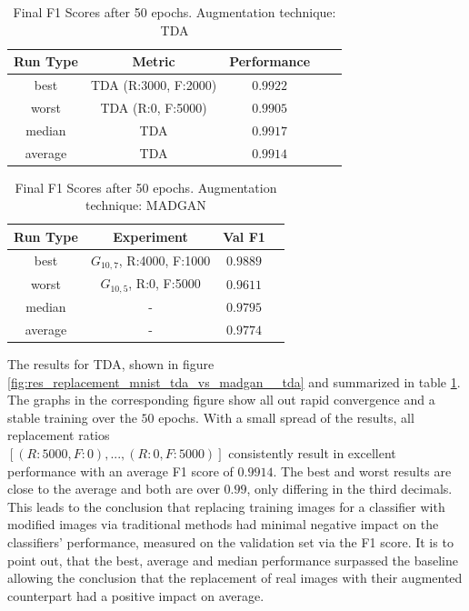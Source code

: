 \begin{table}[H]
	\centering
	\vspace{-1em}
	\begin{tabular}{|c|c|c|c|c|}
		\hline
		Run Type & Metric & Performance \\ \hline
		best & TDA (R:3000, F:2000) & $0.9922$\\ \hline
		worst & TDA (R:0, F:5000) & $0.9905$\\ \hline
		median & TDA & $0.9917$\\ \hline
		average & TDA & $0.9914$
		\\ \hline
	\end{tabular}
    \caption{Final F1 Scores after 50 epochs. Augmentation technique: TDA}
        \label{tab:res_replacement_mnist_tda_vs_madgan__tda}
\end{table}
\begin{table}[H]
	\vspace{-1em}
	\centering
	\begin{tabular}{|c|c|c|c|}
		\hline
		Run Type & Experiment & Val F1 \\ \hline
		best & \(G_{10, 7}\), R:4000, F:1000 & $0.9889$\\ \hline
		worst & \(G_{10, 5}\), R:0, F:5000 & $0.9611$\\ \hline
		median & - & $0.9795$\\ \hline
		average & - & $0.9774$
		\\ \hline
	\end{tabular}
    \caption{Final F1 Scores after 50 epochs. Augmentation technique: MADGAN}
        \label{tab:res_replacement_mnist_tda_vs_madgan__madgan}
\end{table}

The results for TDA, shown in figure \ref{fig:res_replacement_mnist_tda_vs_madgan__tda} and summarized in table \ref{tab:res_replacement_mnist_tda_vs_madgan__tda}. The graphs in the corresponding figure show all out rapid convergence and a stable training over the $50$ epochs. With a small spread of the results, all replacement ratios \\\(\left[ (R:5000, F:0), ..., (R:0, F:5000) \right]\) consistently result in excellent performance with an average F1 score of $0.9914$. The best and worst results are close to the average and both are over $0.99$, only differing in the third decimals. This leads to the conclusion that replacing training images for a classifier with modified images via traditional methods had minimal negative impact on the classifiers' performance, measured on the validation set via the F1 score. It is to point out, that the best, average and median performance surpassed the baseline allowing the conclusion that the replacement of real images with their augmented counterpart had a positive impact on average.

